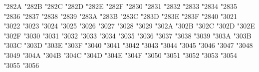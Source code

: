 {\Uchar\jis"282A %
\Uchar\jis"282B %
\Uchar\jis"282C %
\Uchar\jis"282D %
\Uchar\jis"282E %
\Uchar\jis"282F %
\Uchar\jis"2830 %
\Uchar\jis"2831 %
\Uchar\jis"2832 %
\Uchar\jis"2833 %
\Uchar\jis"2834 %
\Uchar\jis"2835 %
\Uchar\jis"2836 %
\Uchar\jis"2837 %
\Uchar\jis"2838 %
\Uchar\jis"2839 %
\Uchar\jis"283A %
\Uchar\jis"283B %
\Uchar\jis"283C %
\Uchar\jis"283D %
\Uchar\jis"283E %
\Uchar\jis"283F %
\Uchar\jis"2840 %
\Uchar\jis"3021 %
\Uchar\jis"3022 %
\Uchar\jis"3023 %
\Uchar\jis"3024 %
\Uchar\jis"3025 %
\Uchar\jis"3026 %
\Uchar\jis"3027 %
\Uchar\jis"3028 %
\Uchar\jis"3029 %
\Uchar\jis"302A %
\Uchar\jis"302B %
\Uchar\jis"302C %
\Uchar\jis"302D %
\Uchar\jis"302E %
\Uchar\jis"302F %
\Uchar\jis"3030 %
\Uchar\jis"3031 %
\Uchar\jis"3032 %
\Uchar\jis"3033 %
\Uchar\jis"3034 %
\Uchar\jis"3035 %
\Uchar\jis"3036 %
\Uchar\jis"3037 %
\Uchar\jis"3038 %
\Uchar\jis"3039 %
\Uchar\jis"303A %
\Uchar\jis"303B %
\Uchar\jis"303C %
\Uchar\jis"303D %
\Uchar\jis"303E %
\Uchar\jis"303F %
\Uchar\jis"3040 %
\Uchar\jis"3041 %
\Uchar\jis"3042 %
\Uchar\jis"3043 %
\Uchar\jis"3044 %
\Uchar\jis"3045 %
\Uchar\jis"3046 %
\Uchar\jis"3047 %
\Uchar\jis"3048 %
\Uchar\jis"3049 %
\Uchar\jis"304A %
\Uchar\jis"304B %
\Uchar\jis"304C %
\Uchar\jis"304D %
\Uchar\jis"304E %
\Uchar\jis"304F %
\Uchar\jis"3050 %
\Uchar\jis"3051 %
\Uchar\jis"3052 %
\Uchar\jis"3053 %
\Uchar\jis"3054 %
\Uchar\jis"3055 %
\Uchar\jis"3056 %
}
